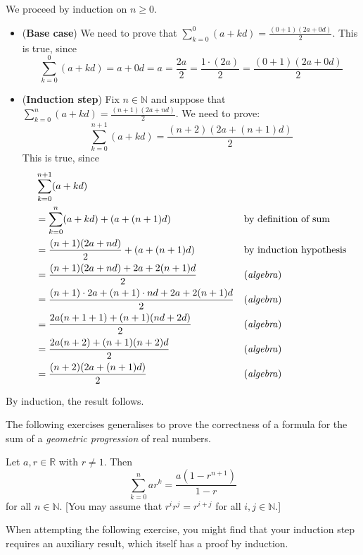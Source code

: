 \begin{cproof}
We proceed by induction on $n \ge 0$.
\begin{itemize}
\item (\textbf{Base case}) We need to prove that $\displaystyle\sum_{k=0}^0 (a+kd) = \frac{(0+1)(2a+0d)}{2}$. This is true, since
\[ \sum_{k=0}^0 (a+kd) = a + 0d = a = \frac{2a}{2} = \frac{1 \cdot (2a)}{2} = \frac{(0+1)(2a+0d)}{2} \]

\item (\textbf{Induction step}) Fix $n \in \mathbb{N}$ and suppose that $\displaystyle\sum_{k=0}^n (a+kd) = \frac{(n+1)(2a+nd)}{2}$. We need to prove:
\[ \sum_{k=0}^{n+1} (a+kd) = \frac{(n+2)(2a+(n+1)d)}{2} \]
This is true, since
\begin{align*}
&\sum_{k=0}^{n+1} (a+kd) && \\
&= \sum_{k=0}^n (a+kd) + (a+(n+1)d) && \text{by definition of sum} \\
&= \frac{(n+1)(2a+nd)}{2} + (a + (n+1)d) && \text{by induction hypothesis} \\
&= \frac{(n+1)(2a+nd) + 2a + 2(n+1)d}{2} && \text{(\textit{algebra})} \\
&= \frac{(n+1) \cdot 2a + (n+1) \cdot nd + 2a + 2(n+1)d}{2} && \text{(\textit{algebra})} \\
&= \frac{2a(n+1+1) + (n+1)(nd + 2d)}{2} && \text{(\textit{algebra})} \\
&= \frac{2a(n+2) + (n+1)(n+2)d}{2} && \text{(\textit{algebra})} \\
&= \frac{(n+2)(2a + (n+1)d)}{2} && \text{(\textit{algebra})}
\end{align*}
\end{itemize}
By induction, the result follows.
\end{cproof}

The following exercises generalises  to prove the correctness of a formula for the sum of a \textit{geometric progression} of real numbers.

\begin{exercise}
\label{exFormulaForGeometricProgression}
Let $a,r \in \mathbb{R}$ with $r \ne 1$. Then
\[ \sum_{k=0}^n ar^k = \frac{a(1-r^{n+1})}{1-r} \]
for all $n \in \mathbb{N}$. [You may assume that $r^ir^j=r^{i+j}$ for all $i,j \in \mathbb{N}$.]
\end{exercise}

When attempting the following exercise, you might find that your induction step requires an auxiliary result, which itself has a proof by induction.

